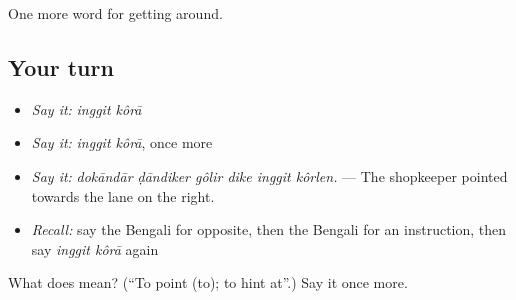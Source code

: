 \begin{grammarlens}[title={What you've built}]
One more word for getting around.
\end{grammarlens}

\subsection*{Your turn}
\begin{itemize}
\raggedright
  \item \emph{Say it:} \emph{inggit kôrā}
  \item \emph{Say it:} \emph{inggit kôrā}, once more
  \item \emph{Say it:} \emph{dokāndār ḍāndiker gôlir dike inggit kôrlen.} — The shopkeeper pointed towards the lane on the right.
  \item \emph{Recall:} say the Bengali for opposite, then the Bengali for an instruction, then say \emph{inggit kôrā} again
\end{itemize}

\begin{tcolorbox}[breakable,colback=teal!4,colframe=teal!35!black,title={Before you move on}]
What does   mean? (\textquotedblleft{}To point (to); to hint at\textquotedblright{}.) Say it once more.
\end{tcolorbox}
